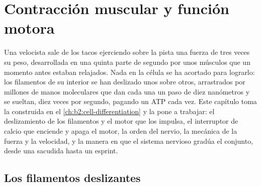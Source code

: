 \chapter{Contracción muscular y función motora}\label{ch:b2:muscle-movement}

Una velocista sale de los tacos ejerciendo sobre la pista una fuerza de
tres veces su peso, desarrollada en una quinta parte de segundo por unos
músculos que un momento antes estaban relajados. Nada en la célula se ha
acortado para lograrlo: los filamentos de su interior se han deslizado
unos sobre otros, arrastrados por millones de manos moleculares que dan
cada una un paso de diez nanómetros y se sueltan, diez veces por segundo,
pagando un ATP cada vez. Este capítulo toma la  construida
en el \cref{ch:b2:cell-differentiation} y la pone a trabajar: el
deslizamiento de los filamentos y el motor que los impulsa, el interruptor
de calcio que enciende y apaga el motor, la orden del nervio, la mecánica
de la fuerza y la velocidad, y la manera en que el sistema nervioso gradúa
el conjunto, desde una sacudida hasta un esprint.

\section{Los filamentos deslizantes}

